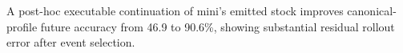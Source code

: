 A post-hoc executable continuation of mini's emitted stock improves canonical-profile future accuracy from 46.9 to 90.6\%, showing substantial residual rollout error after event selection.
